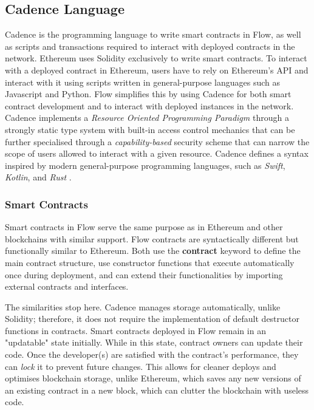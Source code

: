 \documentclass[../NFTComp_IEEE.tex]{subfiles}
\begin{document}
\subsection{Cadence Language}
\label{sec:cadence_language}
Cadence is the programming language to write smart contracts in Flow, as well as scripts and transactions required to interact with deployed contracts in the network. Ethereum uses Solidity exclusively to write smart contracts. To interact with a deployed contract in Ethereum, users have to rely on Ethereum's API and interact with it using scripts written in general-purpose languages such as Javascript and Python. Flow simplifies this by using Cadence for both smart contract development and to interact with deployed instances in the network. Cadence implements a \textit{Resource Oriented Programming Paradigm} through a strongly static type system with built-in access control mechanics that can be further specialised through a \textit{capability-based} security scheme that can narrow the scope of users allowed to interact with a given resource. Cadence defines a syntax inspired by modern general-purpose programming languages, such as \textit{Swift}, \textit{Kotlin}, and \textit{Rust} \cite{flow2020a} \cite{Cadence2023}.

\subsubsection{Smart Contracts}
\label{sec:smart_contracts}
Smart contracts in Flow serve the same purpose as in Ethereum and other blockchains with similar support. Flow contracts are syntactically different but functionally similar to Ethereum. Both use the \textbf{contract} keyword to define the main contract structure, use constructor functions that execute automatically once during deployment, and can extend their functionalities by importing external contracts and interfaces.
\par
The similarities stop here. Cadence manages storage automatically, unlike Solidity; therefore, it does not require the implementation of default destructor functions in contracts. Smart contracts deployed in Flow remain in an "updatable" state initially. While in this state, contract owners can update their code. Once the developer(s) are satisfied with the contract's performance, they can \textit{lock} it to prevent future changes. This allows for cleaner deploys and optimises blockchain storage, unlike Ethereum, which saves any new versions of an existing contract in a new block, which can clutter the blockchain with useless code.
\end{document}
